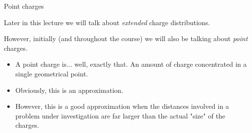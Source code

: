 \begin{frame}{Point charges}

Later in this lecture we will talk about {\em extended} charge distributions.\\
\vspace{0.2cm}

However, initially (and throughout the course) we will also be talking about {\em point} charges.\\
\vspace{0.2cm}
\begin{itemize}
\item
  A point charge is... well, exactly that. An amount of charge concentrated in a single geometrical point.
\item
  Obviously, this is an approximation.
\item
  However, this is a good approximation when the distances involved in a problem under investigation
  are far larger than the actual "size" of the charges.
\end{itemize}

\end{frame}


